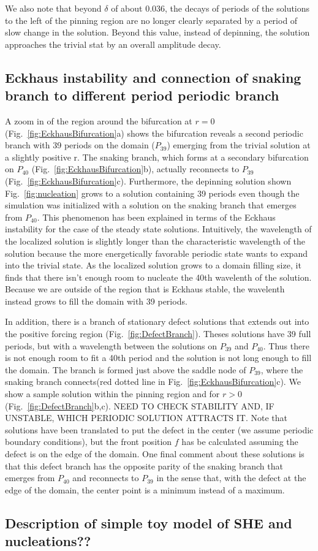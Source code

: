 \documentclass[../main/TimeForcingSHE.tex]{subfiles}
\begin{document}
We also note that beyond $\delta$ of about 0.036, the decays of periods of the solutions to the left of the pinning region are no longer clearly separated by a period of slow change in the solution.  Beyond this value, instead of depinning, the solution approaches the trivial stat by an overall amplitude decay.


\subsection{Eckhaus instability and connection of snaking branch to different period periodic branch}
\FIGeckhausbifurcation
 A zoom in of the region around the bifurcation at $r=0$ (Fig.~\ref{fig:EckhausBifurcation}a) shows the bifurcation reveals a second periodic branch with 39 periods on the domain ($P_{39}$) emerging from the trivial solution at a slightly positive r.   The snaking branch, which forms at a secondary bifurcation on $P_{40}$ (Fig.~\ref{fig:EckhausBifurcation}b), actually reconnects to $P_{39}$ (Fig.~\ref{fig:EckhausBifurcation}c).  Furthermore, the depinning solution shown Fig.~\ref{fig:nucleation} grows to a solution containing 39 periods even though the simulation was initialized with a solution on the snaking branch that emerges from $P_{40}$.  This phenomenon has been explained \cite{bergeon2008} in terms of the Eckhaus instability for the case of the steady state solutions.  Intuitively, the wavelength of the localized solution is slightly longer than the characteristic wavelength of the solution because the more energetically favorable periodic state wants to expand into the trivial state.  As the localized solution grows to a domain filling size, it finds that there isn't enough room to nucleate the 40th wavelenth of the solution.  Because we are outside of the region that is Eckhaus stable, the wavelenth instead grows to fill the domain with 39 periods. 

\FIGdefectbranch
In addition, there is a branch of stationary defect solutions that extends out into the positive forcing region (Fig.~\ref{fig:DefectBranch}).  Theses solutions have 39 full periods, but with a wavelength between the solutions on $P_{39}$ and $P_{40}$.  Thus there is not enough room to fit a 40th period and the solution is not long enough to fill the domain.   The branch is formed just above the saddle node of $P_{39}$, where the snaking branch connects(red dotted line in Fig.~\ref{fig:EckhausBifurcation}c).  We show a sample solution within the pinning region and for $r>0$ (Fig.~\ref{fig:DefectBranch}b,c).  NEED TO CHECK STABILITY AND, IF UNSTABLE,  WHICH PERIODIC SOLUTION ATTRACTS IT. Note that solutions have been translated to put the defect in the center (we assume periodic boundary conditions), but the front position $f$ has be calculated assuming the defect is on the edge of the domain.  One final comment about these solutions is that this defect branch has the opposite parity of the snaking branch that emerges from $P_{40}$ and reconnects to $P_{39}$ in the sense that, with the defect at the edge of the domain, the center point is a minimum instead of a maximum.


\subsection{Description of simple toy model of SHE and nucleations??}
\end{document}
